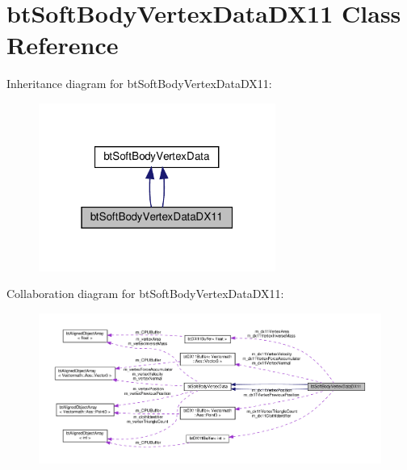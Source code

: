 \hypertarget{classbtSoftBodyVertexDataDX11}{}\section{bt\+Soft\+Body\+Vertex\+Data\+D\+X11 Class Reference}
\label{classbtSoftBodyVertexDataDX11}


Inheritance diagram for bt\+Soft\+Body\+Vertex\+Data\+D\+X11\+:
\nopagebreak
\begin{figure}[H]
\begin{center}
\leavevmode
\includegraphics[width=220pt]{classbtSoftBodyVertexDataDX11__inherit__graph}
\end{center}
\end{figure}


Collaboration diagram for bt\+Soft\+Body\+Vertex\+Data\+D\+X11\+:
\nopagebreak
\begin{figure}[H]
\begin{center}
\leavevmode
\includegraphics[width=350pt]{classbtSoftBodyVertexDataDX11__coll__graph}
\end{center}
\end{figure}
